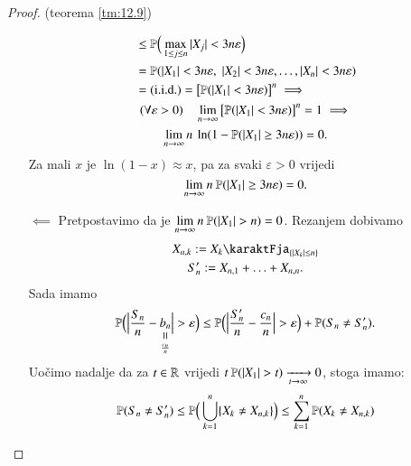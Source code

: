 \begin{proof}{(teorema \ref{tm:12.9})}
\begin{itemize}
\begin{equation*}
\begin{gathered}
\begin{aligned}
                    &\leq \mathbb{P} \Big( \max\limits_{1 \leq j \leq n} |X_j| < 3 n \varepsilon \Big)\\
                    &= \mathbb{P}({|X_1| < 3 n \varepsilon, \; |X_2| < 3 n \varepsilon, \ldots, |X_n| < 3 n \varepsilon})\\
                    &= (\mathrm{i.i.d.}) = \big[ \mathbb{P}({|X_1| < 3 n \varepsilon}) \big]^n \implies                    
                \end{aligned}\\
                    (\forall \varepsilon > 0) \quad \lim\limits_{n \to \infty} \big[ \mathbb{P}({|X_1| < 3 n \varepsilon}) \big]^n = 1 \implies\\
                    \lim\limits_{n \to \infty} n \: \ln ( 1 - \mathbb{P}({|X_1| \geq 3 n \varepsilon}) ) = 0.
            \end{gathered}
        \end{equation*}
        Za mali $x$ je $\ln (1 - x) \approx x$, pa za svaki $\varepsilon > 0$ vrijedi
        \begin{equation*}
            \lim\limits_{n \to \infty} n \: \mathbb{P}({|X_1| \geq 3 n \varepsilon}) = 0.
        \end{equation*}
        \item[$\impliedby$] Pretpostavimo da je $\lim\limits_{n \to \infty} n \: \mathbb{P}({|X_1| > n}) = 0$.
        Rezanjem dobivamo
        \begin{equation*}
            \begin{gathered}
                X_{n, k} := X_k \karaktFja_{\{ |X_k| \leq n \}}\\
                S_n' := X_{n, 1} + \ldots + X_{n, n}.
            \end{gathered}
        \end{equation*}
        Sada imamo
        \begin{equation*}
            \masP \Big( \Big| \frac{S_n}{n} - \equalto{b_n}{\frac{c_n}{n}} \Big| > \varepsilon \Big) \leq \masP \Big( \Big| \frac{S_n'}{n} - \frac{c_n}{n} \Big| > \varepsilon \Big) + \vjeroj{S_n \neq S_n'}.
        \end{equation*}
        Uo\v cimo nadalje da za $t \in \mathbb{R}$ vrijedi $t \: \mathbb{P}({|X_1| > t}) \xrightarrow[t \to \infty]{} 0$, stoga imamo:
        \begin{equation*}
            \begin{aligned}
                \vjeroj{S_n \neq S_n'} &\leq \masP \Big( \unija{k = 1}{n} \{ X_k \neq X_{n, k} \} \Big) \leq \suma{k = 1}{n} \vjeroj{X_k \neq X_{n, k}}\\

\end{aligned}
\end{equation*}
\end{itemize}
\end{proof}
